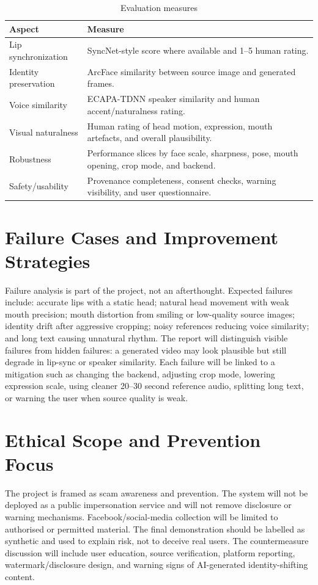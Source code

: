 \documentclass[10pt,conference]{IEEEtran}
\begin{document}
\begin{table}[H]
\caption{Evaluation measures}
\label{tab:eval}
\centering
\scriptsize
\begin{tabular}{@{}p{}p{}@{}}
\toprule
\textbf{Aspect} & \textbf{Measure} \\
\midrule
Lip synchronization & SyncNet-style score where available and 1--5 human rating. \\
Identity preservation & ArcFace similarity between source image and generated frames. \\
Voice similarity & ECAPA-TDNN speaker similarity and human accent/naturalness rating. \\
Visual naturalness & Human rating of head motion, expression, mouth artefacts, and overall plausibility. \\
Robustness & Performance slices by face scale, sharpness, pose, mouth opening, crop mode, and backend. \\
Safety/usability & Provenance completeness, consent checks, warning visibility, and user questionnaire. \\
\bottomrule
\end{tabular}
\end{table}

\section{Failure Cases and Improvement Strategies}
Failure analysis is part of the project, not an afterthought. Expected failures include: accurate lips with a static head; natural head movement with weak mouth precision; mouth distortion from smiling or low-quality source images; identity drift after aggressive cropping; noisy references reducing voice similarity; and long text causing unnatural rhythm. The report will distinguish visible failures from hidden failures: a generated video may look plausible but still degrade in lip-sync or speaker similarity. Each failure will be linked to a mitigation such as changing the backend, adjusting crop mode, lowering expression scale, using cleaner 20--30 second reference audio, splitting long text, or warning the user when source quality is weak.

\section{Ethical Scope and Prevention Focus}
The project is framed as scam awareness and prevention. The system will not be deployed as a public impersonation service and will not remove disclosure or warning mechanisms. Facebook/social-media collection will be limited to authorised or permitted material. The final demonstration should be labelled as synthetic and used to explain risk, not to deceive real users. The countermeasure discussion will include user education, source verification, platform reporting, watermark/disclosure design, and warning signs of AI-generated identity-shifting content.
\end{document}
